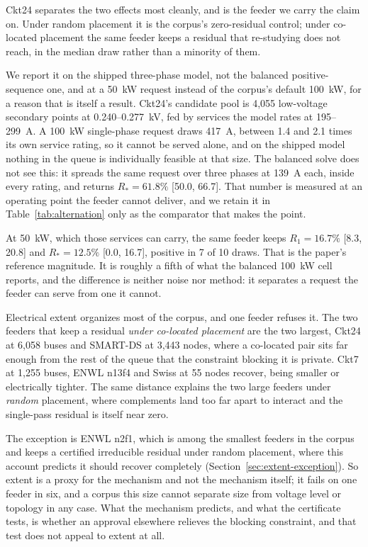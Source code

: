 \documentclass[review,authoryear,12pt]{elsarticle}
\begin{document}
Ckt24 separates the two effects most cleanly, and is the feeder we carry the
claim on. Under random placement it is the corpus's zero-residual control;
under co-located placement the same feeder keeps a residual that re-studying
does not reach, in the median draw rather than a minority of them.

We report it on the shipped three-phase model, not the balanced
positive-sequence one, and at a 50~kW request instead of the corpus's default
100~kW, for a reason that is itself a result. Ckt24's candidate pool is 4{,}055
low-voltage secondary points at 0.240--0.277~kV, fed by services the model
rates at 195--299~A. A 100~kW single-phase request draws 417~A, between 1.4
and 2.1 times its own service rating, so it cannot be served alone, and on
the shipped model nothing in the queue is individually feasible at that size.
The balanced solve does not see this: it spreads the same request over three
phases at 139~A each, inside every rating, and returns
$R_{\ast} = 61.8\%$ [50.0, 66.7]. That number is measured at an operating point
the feeder cannot deliver, and we retain it in
Table~\ref{tab:alternation} only as the comparator that makes the point.

At 50~kW, which those services can carry, the same feeder keeps
$R_{1} = 16.7\%$ [8.3, 20.8] and
$R_{\ast} = \mathbf{12.5\%}$ [0.0, 16.7], positive in 7 of 10 draws. That is
the paper's reference magnitude. It is roughly a fifth of what the balanced
100~kW cell reports, and the difference is neither noise nor method: it
separates a request the feeder can serve from one it cannot.

Electrical extent organizes most of the corpus, and one feeder refuses it. The
two feeders that keep a residual \emph{under co-located placement} are the two
largest, Ckt24 at 6{,}058 buses and SMART-DS at 3{,}443 nodes, where a
co-located pair sits far enough from the rest of the queue that the constraint
blocking it is private. Ckt7 at 1{,}255 buses, ENWL n13f4 and Swiss at 55 nodes
recover, being smaller or electrically tighter. The same distance explains the
two large feeders under \emph{random} placement, where complements land too far
apart to interact and the single-pass residual is itself near zero.

The exception is ENWL n2f1, which is among the smallest feeders in the corpus
and keeps a certified irreducible residual under random placement, where this
account predicts it should recover completely
(Section~\ref{sec:extent-exception}). So extent is a proxy for the mechanism
and not the mechanism itself; it fails on one feeder in six, and a corpus this
size cannot separate size from voltage level or topology in any case. What the
mechanism predicts, and what the certificate tests, is whether an approval
elsewhere relieves the blocking constraint, and that test does not appeal to
extent at all.
\end{document}
